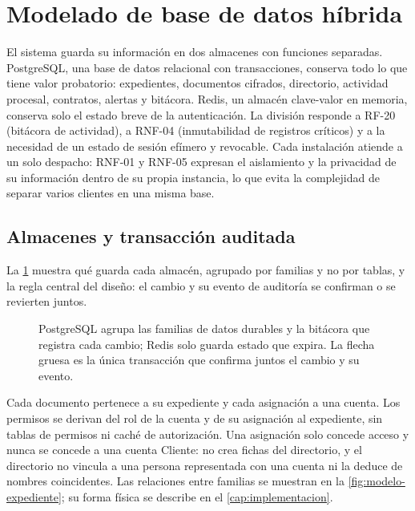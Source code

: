 \section{Modelado de base de datos híbrida}\label{sec:bd-hibrida}

El sistema guarda su información en dos almacenes con funciones separadas. PostgreSQL, una base de datos relacional con transacciones, conserva todo lo que tiene valor probatorio: expedientes, documentos cifrados, directorio, actividad procesal, contratos, alertas y bitácora. Redis, un almacén clave-valor en memoria, conserva solo el estado breve de la autenticación. La división responde a RF-20 (bitácora de actividad), a RNF-04 (inmutabilidad de registros críticos) y a la necesidad de un estado de sesión efímero y revocable. Cada instalación atiende a un solo despacho: RNF-01 y RNF-05 expresan el aislamiento y la privacidad de su información dentro de su propia instancia, lo que evita la complejidad de separar varios clientes en una misma base.

\subsection{Almacenes y transacción auditada}\label{sec:diagrama-datos}

La \cref{fig:modelo-datos} muestra qué guarda cada almacén, agrupado por familias y no por tablas, y la regla central del diseño: el cambio y su evento de auditoría se confirman o se revierten juntos.

\begin{figure}[!tbp]
  \centering
  
  \caption{PostgreSQL agrupa las familias de datos durables y la bitácora que registra cada cambio; Redis solo guarda estado que expira. La flecha gruesa es la única transacción que confirma juntos el cambio y su evento.}
  \label{fig:modelo-datos}
\end{figure}

Cada documento pertenece a su expediente y cada asignación a una cuenta. Los permisos se derivan del rol de la cuenta y de su asignación al expediente, sin tablas de permisos ni caché de autorización. Una asignación solo concede acceso y nunca se concede a una cuenta Cliente: no crea fichas del directorio, y el directorio no vincula a una persona representada con una cuenta ni la deduce de nombres coincidentes. Las relaciones entre familias se muestran en la \cref{fig:modelo-expediente}; su forma física se describe en el \cref{cap:implementacion}.

